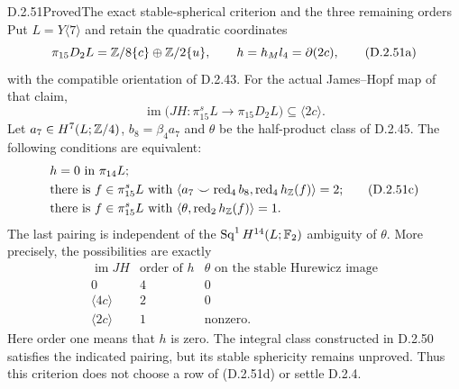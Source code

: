 \begin{claim}{D.2.51}{Proved}{The exact stable-spherical criterion and the three remaining orders}
Put $L=Y\langle7\rangle$ and retain the quadratic coordinates
\[
 \pi_{15}D_2L=\mathbb Z/8\{c\}\oplus\mathbb Z/2\{u\},
 \qquad h=h_Ml_4=\partial(2c),
 \tag{D.2.51a}
\]
with the compatible orientation of D.2.43.  For the actual
James--Hopf map of that claim,
\[
          \operatorname{im}\bigl(JH:\pi_{15}^sL
                      \longrightarrow\pi_{15}D_2L\bigr)
                         \subseteq\langle2c\rangle.
          \tag{D.2.51b}
\]
Let $a_7\in H^7(L;\mathbb Z/4)$, $b_8=\beta_4a_7$ and $\theta$
be the half-product class of D.2.45.  The following conditions
are equivalent:
\[
\begin{aligned}
 &h=0\text{ in }\pi_{14}L;\\
 &\text{there is }f\in\pi_{15}^sL\text{ with }
       \langle a_7\smile\operatorname{red}_4b_8,
                    \operatorname{red}_4h_{\mathbb Z}(f)\rangle=2;\\
 &\text{there is }f\in\pi_{15}^sL\text{ with }
       \langle\theta,\operatorname{red}_2h_{\mathbb Z}(f)\rangle=1.
\end{aligned}
\tag{D.2.51c}
\]
The last pairing is independent of the
$\operatorname{Sq}^1H^{14}(L;\mathbb F_2)$ ambiguity of $\theta$.
More precisely, the possibilities are exactly
\[
\begin{array}{c|c|c}
 \operatorname{im}JH&\text{order of }h&
     \theta\text{ on the stable Hurewicz image}\\ \hline
 0&4&0\\
 \langle4c\rangle&2&0\\
 \langle2c\rangle&1&\text{nonzero}.
\end{array}
\tag{D.2.51d}
\]
Here order one means that $h$ is zero.  The integral class
constructed in D.2.50 satisfies the indicated pairing, but
its stable sphericity remains unproved.  Thus this criterion
does not choose a row of \textup{(D.2.51d)} or settle D.2.4.
\end{claim}
